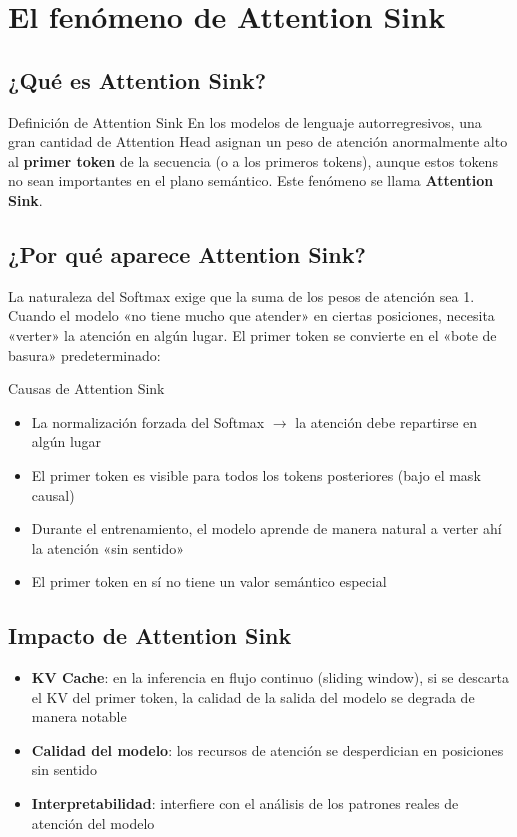 \section{El fenómeno de Attention Sink}

\subsection{¿Qué es Attention Sink?}

\begin{importantbox}{Definición de Attention Sink}
En los modelos de lenguaje autorregresivos, una gran cantidad de Attention Head asignan un peso de atención anormalmente alto al \textbf{primer token} de la secuencia (o a los primeros tokens), aunque estos tokens no sean importantes en el plano semántico. Este fenómeno se llama \textbf{Attention Sink}.
\end{importantbox}

\subsection{¿Por qué aparece Attention Sink?}

La naturaleza del Softmax exige que la suma de los pesos de atención sea 1. Cuando el modelo «no tiene mucho que atender» en ciertas posiciones, necesita «verter» la atención en algún lugar. El primer token se convierte en el «bote de basura» predeterminado:

\begin{warningbox}{Causas de Attention Sink}
\begin{itemize}
  \item La normalización forzada del Softmax $\to$ la atención debe repartirse en algún lugar
  \item El primer token es visible para todos los tokens posteriores (bajo el mask causal)
  \item Durante el entrenamiento, el modelo aprende de manera natural a verter ahí la atención «sin sentido»
  \item El primer token en sí no tiene un valor semántico especial
\end{itemize}
\end{warningbox}

\subsection{Impacto de Attention Sink}

\begin{itemize}
  \item \textbf{KV Cache}: en la inferencia en flujo continuo (sliding window), si se descarta el KV del primer token, la calidad de la salida del modelo se degrada de manera notable
  \item \textbf{Calidad del modelo}: los recursos de atención se desperdician en posiciones sin sentido
  \item \textbf{Interpretabilidad}: interfiere con el análisis de los patrones reales de atención del modelo
\end{itemize}

